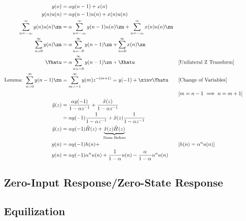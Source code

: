 \begin{align*}
    y(n)
    &=
    \alpha y(n-1) + x(n)
    \\
    y(n) u(n)
    &=
    \alpha y(n-1)u(n) + x(n)u(n)
    \\
    \sum_{n=-\infty}^{\infty} y(n) u(n)\zn
    &=
    \alpha \sum_{n=-\infty}^{\infty} y(n-1)u(n)\zn + \sum_{n=-\infty}^{\infty} x(n)u(n)\zn
    \\
    \sum_{n=0}^{\infty} y(n) \zn
    &=
    \alpha \sum_{n=-0}^{\infty} y(n-1)\zn + \sum_{n=0}^{\infty} x(n)\zn
    \\
    \Yhatu
    &=
    \alpha \sum_{n=-0}^{\infty} y(n-1)\zn + \Xhatu
    &&\text{[Unilateral Z Transform]}
    \\
    \text{Lemma: }
    \sum_{n=0}^{\infty} y(n-1) \zn
    &=
    \sum_{m=-1}^{\infty} y(m) z^{-(m+1)}
    = y(-1) + \zinv \Yhatu
    &&\text{[Change of Variables]}
    \\
    &
    &&\text{[$m=n-1\implies n=m+1$]}
    \\
    \hat{y}(z) &=\frac{\alpha y(-1)}{1-\alpha z^{-1}}+\frac{\hat{x}(z)}{1-\alpha z^{-1}} \\
    &=\alpha y(-1) \frac{1}{1-\alpha z^{-1}}+\hat{x}(z) \frac{1}{1-\alpha z^{-1}} \\
    \hat{y}(z) &=\alpha y(-1) \hat{H}(z)+\underbrace{\hat{x}(z) \hat{H}(z)}_{\text{Done Before}}
    \\
    y(n)&= \alpha y(-1)h(n)+
    &&\text{[$h(n)=\alpha^{n}u(n)$]}
    \\
    y(n)&= \alpha y(-1)\alpha^{n}u(n)
    + \frac{1}{1-\alpha}u(n) - \frac{\alpha}{1-\alpha}\alpha^n u(n)
\end{align*}

\subsection{Zero-Input Response/Zero-State Response}

\subsection{Equilization}
